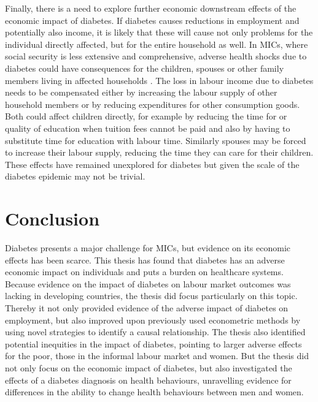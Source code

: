 Finally, there is a need to explore further economic downstream effects of the economic impact of diabetes. If diabetes causes reductions in employment and potentially also income, it is likely that these will cause not only problems for the individual directly affected, but for the entire household as well. In \acp{MIC}, where social security is less extensive and comprehensive, adverse health shocks due to diabetes could have consequences for the children, spouses or other family members living in affected households \parencite{Alam2014}. The loss in labour income due to diabetes needs to be compensated either by increasing the labour supply of other household members or by reducing expenditures for other consumption goods. Both could affect children directly, for example by reducing the time for or quality of education when tuition fees cannot be paid \DIFdelbegin {}\DIFdelend \DIFaddbegin {}\DIFaddend and also by having to substitute time for education with labour time. Similarly spouses may be forced to increase their labour supply, reducing the time they can care for their children. These effects have remained unexplored for diabetes but given the scale of the diabetes epidemic may not be trivial.



\section{Conclusion}

Diabetes presents a major challenge for \acp{MIC}, but evidence on its economic effects has been scarce. This thesis has found that diabetes has an adverse economic impact on individuals and puts a burden on healthcare systems. Because evidence on the impact of diabetes on labour market outcomes was lacking in developing countries, the thesis did focus particularly on this topic. Thereby it not only provided evidence of the adverse impact of diabetes on employment, but also improved upon previously used econometric methods by using novel strategies to identify a causal relationship. The thesis also identified potential inequities in the impact of diabetes, pointing to larger adverse effects for the poor, those in the informal labour market and women. But the thesis did not only focus on the economic impact of diabetes, but also investigated the effects of a diabetes diagnosis on health behaviours, unravelling evidence for differences in the ability to change health behaviours between men and women.

